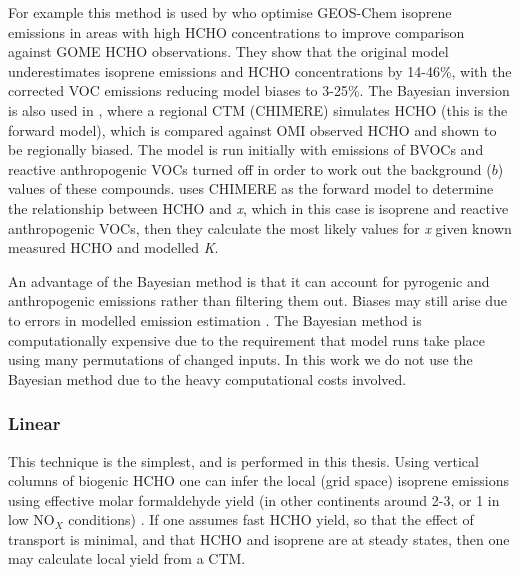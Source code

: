       For example this method is used by \textcite{Shim2005} who optimise GEOS-Chem isoprene emissions in areas with high HCHO concentrations to improve comparison against GOME HCHO observations. %
      They show that the original model underestimates isoprene emissions and HCHO concentrations by 14-46\%, with the corrected VOC emissions reducing model biases to 3-25\%.
      The Bayesian inversion is also used in \textcite{Curci2010}, where a regional CTM (CHIMERE) simulates HCHO (this is the forward model), which is compared against OMI observed HCHO and shown to be regionally biased.
      The model is run initially with emissions of BVOCs and reactive anthropogenic VOCs turned off in order to work out the background ($b$) values of these compounds.
      \textcite{Curci2010} uses CHIMERE as the forward model to determine the relationship between HCHO and \emph{x}, which in this case is isoprene and reactive anthropogenic VOCs, then they calculate the most likely values for \emph{x} given known measured HCHO and modelled \emph{K}.
      
      
      An advantage of the Bayesian method is that it can account for pyrogenic and anthropogenic emissions rather than filtering them out.
      Biases may still arise due to errors in modelled emission estimation \parencite{Curci2010}.
      The Bayesian method is computationally expensive due to the requirement that model runs take place using many permutations of changed inputs.
      In this work we do not use the Bayesian method due to the heavy computational costs involved.
      
        
    
    \subsubsection{Linear}
      \label{BioIsop:intro:top_down_linear}
      
      This technique is the simplest, and is performed in this thesis.
      Using vertical columns of biogenic HCHO one can infer the local (grid space) isoprene emissions using effective molar formaldehyde yield (in other continents around 2-3, or 1 in low NO$_X$ conditions) \parencite{Palmer2003,Marais2012,Bauwens2016}.
      If one assumes fast HCHO yield, so that the effect of transport is minimal, and that HCHO and isoprene are at steady states, then one may calculate local yield from a CTM.
      
